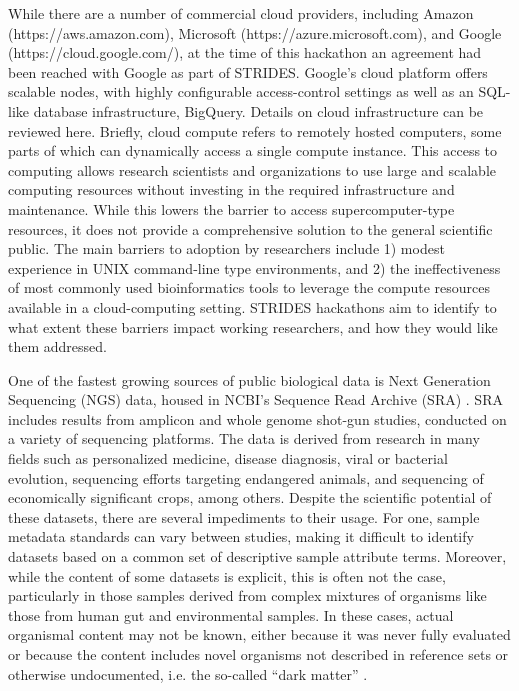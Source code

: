 While there are a number of commercial cloud providers, including Amazon
(https://aws.amazon.com), Microsoft (https://azure.microsoft.com), and Google
(https://cloud.google.com/), at the time of this hackathon an agreement had
been reached with Google as part of STRIDES. Google's cloud platform offers
scalable nodes, with highly configurable access-control settings as well as an
SQL-like database infrastructure, BigQuery. Details on cloud infrastructure can
be reviewed here. Briefly, cloud compute refers to remotely hosted computers,
some parts of which can dynamically access a single compute instance. This
access to computing allows research scientists and organizations to use large
and scalable computing resources without investing in the required
infrastructure and maintenance. While this lowers the barrier to access
supercomputer-type resources, it does not provide a comprehensive solution to
the general scientific public. The main barriers to adoption by researchers
include 1) modest experience in UNIX command-line type environments, and 2) the
ineffectiveness of most commonly used bioinformatics tools to leverage the
compute resources available in a cloud-computing setting. STRIDES hackathons
aim to identify to what extent these barriers impact working researchers, and
how they would like them addressed.

One of the fastest growing sources of public biological data is Next Generation
Sequencing (NGS) data, housed in NCBI's Sequence Read Archive (SRA)
\cite{Leinonen2011}. SRA includes results from amplicon and whole genome
shot-gun studies, conducted on a variety of sequencing platforms. The data is
derived from research in many fields such as personalized medicine, disease
diagnosis, viral or bacterial evolution, sequencing efforts targeting
endangered animals, and sequencing of economically significant crops, among
others. Despite the scientific potential of these datasets, there are several
impediments to their usage. For one, sample metadata standards can vary between
studies, making it difficult to identify datasets based on a common set of
descriptive sample attribute terms. Moreover, while the content of some
datasets is explicit, this is often not the case, particularly in those samples
derived from complex mixtures of organisms like those from human gut  and
environmental samples.  In these cases, actual organismal content may not be
known, either because it was never fully evaluated or because the content
includes novel organisms not described in reference sets or otherwise
undocumented, i.e. the so-called “dark matter” \cite{Roux2015}.


